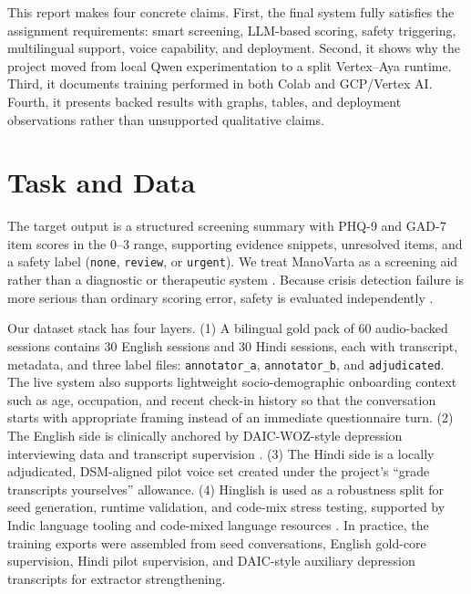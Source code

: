 \documentclass[11pt]{article}
\begin{document}
This report makes four concrete claims. First, the final system fully satisfies the assignment requirements: smart screening, LLM-based scoring, safety triggering, multilingual support, voice capability, and deployment. Second, it shows why the project moved from local Qwen experimentation to a split Vertex--Aya runtime. Third, it documents training performed in both Colab and GCP/Vertex AI. Fourth, it presents backed results with graphs, tables, and deployment observations rather than unsupported qualitative claims.

\section{Task and Data}
The target output is a structured screening summary with PHQ-9 and GAD-7 item scores in the 0--3 range, supporting evidence snippets, unresolved items, and a safety label (\texttt{none}, \texttt{review}, or \texttt{urgent}). We treat ManoVarta as a screening aid rather than a diagnostic or therapeutic system \citep{abd2020chatbots,dosovitsky2021chatbot}. Because crisis detection failure is more serious than ordinary scoring error, safety is evaluated independently \citep{zirikly2019clpsych,pichowicz2025suicidal}.

Our dataset stack has four layers. (1) A bilingual gold pack of 60 audio-backed sessions contains 30 English sessions and 30 Hindi sessions, each with transcript, metadata, and three label files: \texttt{annotator\_a}, \texttt{annotator\_b}, and \texttt{adjudicated}. The live system also supports lightweight socio-demographic onboarding context such as age, occupation, and recent check-in history so that the conversation starts with appropriate framing instead of an immediate questionnaire turn. (2) The English side is clinically anchored by DAIC-WOZ-style depression interviewing data and transcript supervision \citep{burdisso2024daic}. (3) The Hindi side is a locally adjudicated, DSM-aligned pilot voice set created under the project's ``grade transcripts yourselves'' allowance. (4) Hinglish is used as a robustness split for seed generation, runtime validation, and code-mix stress testing, supported by Indic language tooling and code-mixed language resources \citep{kakwani2020indicnlpsuite,nayak2022hingbert}. In practice, the training exports were assembled from seed conversations, English gold-core supervision, Hindi pilot supervision, and DAIC-style auxiliary depression transcripts for extractor strengthening.
\end{document}
